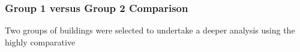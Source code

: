 \subsubsection{Group 1 versus Group 2 Comparison}
\label{sec:group1vsgroup2}

Two groups of buildings were selected to undertake a deeper analysis using the highly comparative